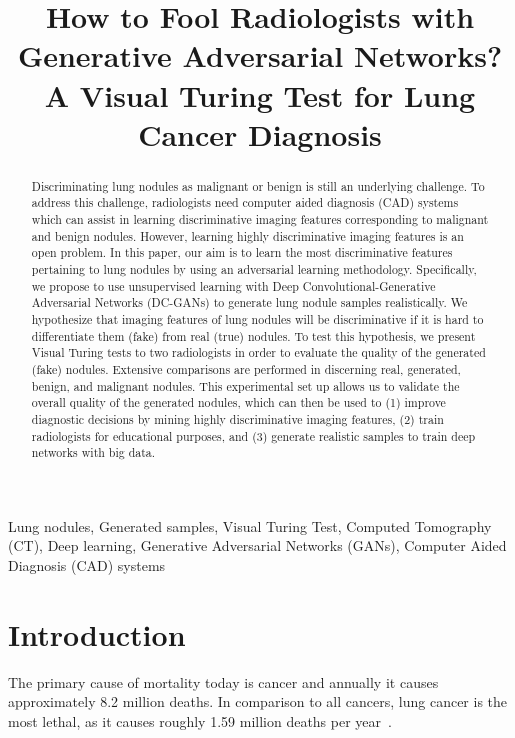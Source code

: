 \documentclass{article}
\title{How to Fool Radiologists with Generative Adversarial Networks?\\ A Visual Turing Test for Lung Cancer Diagnosis}
\begin{document}
\BgThispage

\maketitle


\begin{abstract}
Discriminating lung nodules as malignant or benign is still an underlying challenge. To address this challenge, radiologists need computer aided diagnosis (CAD) systems which can assist in learning discriminative imaging features corresponding to malignant and benign nodules. However, learning highly discriminative imaging features is an open problem. In this paper, our aim is to learn the most discriminative features pertaining to lung nodules by using an adversarial learning methodology. Specifically, we propose to use unsupervised learning with Deep Convolutional-Generative Adversarial Networks (DC-GANs) to generate lung nodule samples realistically. We hypothesize that imaging features of lung nodules will be discriminative if it is hard to differentiate them (fake) from real (true) nodules. To test this hypothesis, we present Visual Turing tests to two radiologists in order to evaluate the quality of the generated (fake) nodules. Extensive comparisons are performed in discerning real, generated, benign, and malignant nodules. This experimental set up allows us to validate the overall quality of the generated nodules, which can then be used to (1) improve diagnostic decisions by mining highly discriminative imaging features, (2) train radiologists for educational purposes, and (3) generate realistic samples to train deep networks with big data. 



\end{abstract}

\begin{keywords}
Lung nodules, Generated samples, Visual Turing Test, Computed Tomography (CT), Deep learning, Generative Adversarial Networks (GANs), Computer Aided Diagnosis (CAD) systems 
\end{keywords}

\vspace{-10 px}

\section{Introduction}
\label{sec:intro}
The primary cause of mortality today is cancer and annually it causes approximately 8.2 million deaths. In comparison to all cancers, lung cancer is the most lethal, as it causes roughly 1.59 million deaths per year~\cite{stewart2016world}.
\end{document}
